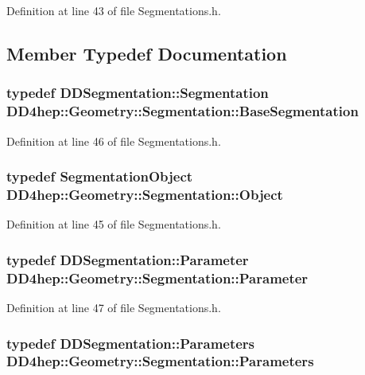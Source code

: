 Definition at line 43 of file Segmentations.h.

\subsection{Member Typedef Documentation}
\hypertarget{class_d_d4hep_1_1_geometry_1_1_segmentation_a50fcd62c91daf63c26a333d1ee51b192}{
\subsubsection[{BaseSegmentation}]{\setlength{\rightskip}{0pt plus 5cm}typedef {\bf DDSegmentation::Segmentation} {\bf DD4hep::Geometry::Segmentation::BaseSegmentation}}}
\label{class_d_d4hep_1_1_geometry_1_1_segmentation_a50fcd62c91daf63c26a333d1ee51b192}


Definition at line 46 of file Segmentations.h.\hypertarget{class_d_d4hep_1_1_geometry_1_1_segmentation_a91154cc3b58985ac86388d00572ee48f}{
\subsubsection[{Object}]{\setlength{\rightskip}{0pt plus 5cm}typedef {\bf SegmentationObject} {\bf DD4hep::Geometry::Segmentation::Object}}}
\label{class_d_d4hep_1_1_geometry_1_1_segmentation_a91154cc3b58985ac86388d00572ee48f}


Definition at line 45 of file Segmentations.h.\hypertarget{class_d_d4hep_1_1_geometry_1_1_segmentation_a179c843c1bc64eabb85be55e2538be19}{
\subsubsection[{Parameter}]{\setlength{\rightskip}{0pt plus 5cm}typedef {\bf DDSegmentation::Parameter} {\bf DD4hep::Geometry::Segmentation::Parameter}}}
\label{class_d_d4hep_1_1_geometry_1_1_segmentation_a179c843c1bc64eabb85be55e2538be19}


Definition at line 47 of file Segmentations.h.\hypertarget{class_d_d4hep_1_1_geometry_1_1_segmentation_af7d9af7b574fa9039f44befc61b7e46f}{
\subsubsection[{Parameters}]{\setlength{\rightskip}{0pt plus 5cm}typedef {\bf DDSegmentation::Parameters} {\bf DD4hep::Geometry::Segmentation::Parameters}}}
\label{class_d_d4hep_1_1_geometry_1_1_segmentation_af7d9af7b574fa9039f44befc61b7e46f}


